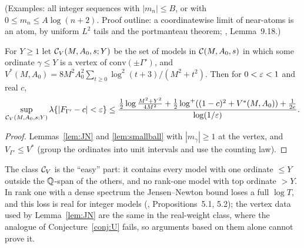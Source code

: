 (Examples: all integer sequences with $|m_n|\le B$, or with $0\le m_n\le A\log(n+2)$. Proof outline: a coordinatewise limit of near-atoms is an atom, by uniform $L^2$ tails and the portmanteau theorem; , Lemma~9.18.)

\begin{corollary}\label{cor:Ucase}
For $Y\ge1$ let $\mathcal C_V(M,A_0,s;Y)$ be the set of models in $\mathcal C(M,A_0,s)$ in which some ordinate $\gamma\le Y$ is a vertex of $\mathrm{conv}(\pm\Gamma')$, and $V^*(M,A_0)=8M^2A_0^2\sum_{t\ge0}\log^2(t+3)/(M^2+t^2)$. Then for $0<\varepsilon<1$ and real $c$,
\[
\sup_{\mathcal C_V(M,A_0,s;Y)}\lambda\{|F_{\Gamma'}-c|<\varepsilon\}\le\frac{\frac12\log\frac{M^2+Y^2}{4M^2}+\frac12\log^+((1-c)^2+V^*(M,A_0))+\frac1{2e}}{\log(1/\varepsilon)} .
\]
\end{corollary}

\begin{proof}
Lemmas~\ref{lem:JN} and \ref{lem:smallball} with $|m_\gamma|\ge1$ at the vertex, and $V_{\Gamma'}\le V^*$ (group the ordinates into unit intervals and use the counting law).
\end{proof}

The class $\mathcal C_V$ is the ``easy'' part: it contains every model with one ordinate $\le Y$ outside the $\mathbb Q$-span of the others, and no rank-one model with top ordinate $>Y$. In rank one with a dense spectrum the Jensen--Newton bound loses a full $\log T$, and this loss is real for integer models (, Propositions~5.1, 5.2); the vertex data used by Lemma~\ref{lem:JN} are the same in the real-weight class, where the analogue of Conjecture~\ref{conj:U} fails, so arguments based on them alone cannot prove it.

